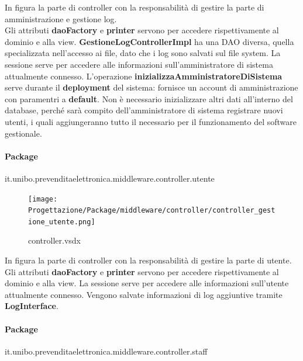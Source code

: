 \documentclass[a4paper]{article}
\begin{document}
In figura la parte di controller con la responsabilità di gestire la parte di amministrazione e gestione log.\\Gli attributi \textbf{daoFactory} e \textbf{printer} servono per accedere rispettivamente al dominio e alla view. \textbf{GestioneLogControllerImpl} ha una DAO diversa, quella specializzata nell'accesso ai file, dato che i log sono salvati sul file system. La sessione serve per accedere alle informazioni sull'amministratore di sistema attualmente connesso. L'operazione \textbf{inizializzaAmministratoreDiSistema} serve durante il \textbf{deployment} del sistema: fornisce un account di amministrazione con paramentri a \textbf{default}. Non è necessario inizializzare altri dati all'interno del database, perché sarà compito dell'amministratore di sistema registrare nuovi utenti, i quali aggiungeranno tutto il necessario per il funzionamento del software gestionale.

\newpage

\paragraph{Package} it.unibo.prevenditaelettronica.middleware.controller.utente


\begin{figure}[H]
    \texttt{[image: Progettazione/Package/middleware/controller/controller\_gestione\_utente.png]}
    \centering
    \caption{controller.vsdx}
\end{figure}

In figura la parte di controller con la responsabilità di gestire la parte di utente.\\Gli attributi \textbf{daoFactory} e \textbf{printer} servono per accedere rispettivamente al dominio e alla view. La sessione serve per accedere alle informazioni sull'utente  attualmente connesso. Vengono salvate informazioni di log aggiuntive tramite \textbf{LogInterface}.

\newpage

\paragraph{Package} it.unibo.prevenditaelettronica.middleware.controller.staff

\end{document}
